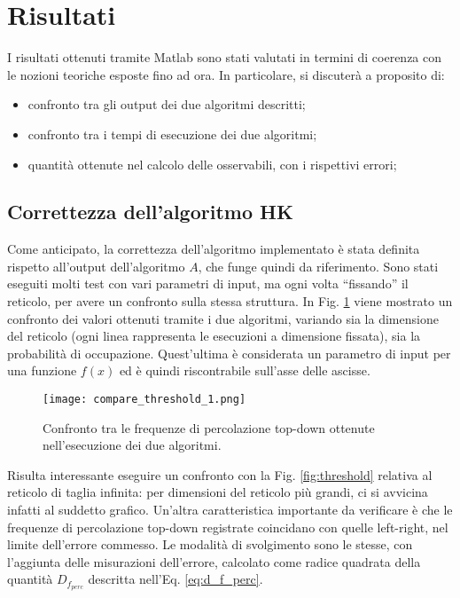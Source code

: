 \section{Risultati}
I risultati ottenuti tramite Matlab sono stati valutati in termini di coerenza con 
le nozioni teoriche esposte fino ad ora. In particolare, si discuterà a proposito di:
\begin{itemize}
    \item confronto tra gli output dei due algoritmi descritti;
    \item confronto tra i tempi di esecuzione dei due algoritmi;
    \item quantità ottenute nel calcolo delle osservabili, con i rispettivi errori;
\end{itemize}

\subsection*{Correttezza dell'algoritmo HK}
Come anticipato, la correttezza dell'algoritmo implementato è stata definita rispetto 
all'output dell'algoritmo $A$, che funge quindi da riferimento.
Sono stati eseguiti molti test con vari parametri di input, ma ogni volta 
``fissando'' il reticolo, per avere un confronto sulla stessa struttura.
In Fig. \ref{fig:compare_threshold} viene mostrato un confronto dei valori 
ottenuti tramite i due algoritmi, variando sia la dimensione del reticolo (ogni linea
rappresenta le esecuzioni a dimensione fissata), sia la probabilità di occupazione.
Quest'ultima è considerata un parametro di input per una funzione $f(x)$ ed è
quindi riscontrabile sull'asse delle ascisse. 
\begin{figure}[ht]
    \texttt{[image: compare\_threshold\_1.png]}
    \caption{Confronto tra le frequenze di percolazione top-down ottenute nell'esecuzione
    dei due algoritmi.}
    \label{fig:compare_threshold}
\end{figure}
Risulta interessante eseguire un confronto con la Fig. \ref{fig:threshold} 
relativa al reticolo di taglia infinita: per dimensioni del reticolo più grandi, ci 
si avvicina infatti al suddetto grafico.
Un'altra caratteristica importante da verificare è che le frequenze di 
percolazione top-down registrate coincidano con quelle left-right, nel limite 
dell'errore commesso. Le modalità di svolgimento sono le stesse, con l'aggiunta 
delle misurazioni dell'errore, calcolato come radice quadrata della quantità 
$D_{f_{perc}}$ descritta nell'Eq. \ref{eq:d_f_perc}.

